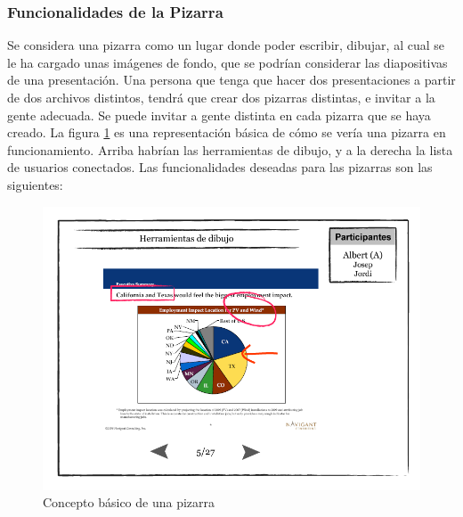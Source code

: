 \subsubsection{Funcionalidades de la Pizarra}
Se considera una pizarra como un lugar donde poder escribir, dibujar, al cual se le ha cargado unas imágenes de fondo, que se podrían considerar las diapositivas de una presentación. Una persona que tenga que hacer dos presentaciones a partir de dos archivos distintos, tendrá que crear dos pizarras distintas, e invitar a la gente adecuada. Se puede invitar a gente distinta en cada pizarra que se haya creado. La figura \ref{fig:concept1} es una representación básica de cómo se vería una pizarra en funcionamiento. Arriba habrían las herramientas de dibujo, y a la derecha la lista de usuarios conectados. Las funcionalidades deseadas para las pizarras son las siguientes:

\begin{figure}[ht]
\centering
\includegraphics[width=16cm]{concepto.png}
\caption{Concepto básico de una pizarra}\label{fig:concept1}
\end{figure}


